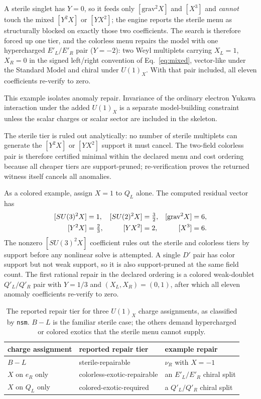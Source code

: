 \documentclass[11pt]{article}
\newcommand{\nsm}{\texttt{nsm}}
\newcommand{\UX}{U(1)_X}
\newcommand{\SUthree}{SU(3)}
\newcommand{\SUtwo}{SU(2)}
\begin{document}
A sterile singlet has $Y=0$, so it feeds only $[\text{grav}^2X]$ and $[X^3]$ and
\emph{cannot} touch the mixed $[Y^2X]$ or $[YX^2]$; the engine reports the
sterile menu as structurally blocked on exactly those two coefficients. The
search is therefore forced up one tier, and the colorless menu repairs the model
with one hypercharged $E'_L/E'_R$ pair ($Y=-2$): two Weyl multiplets carrying
$X_L=1$, $X_R=0$ in the signed left/right convention of Eq.~\eqref{eq:mixed},
vector-like under the Standard Model and chiral under $\UX$. With that pair
included, all eleven coefficients re-verify to zero.

This example isolates anomaly repair. Invariance of the ordinary electron
Yukawa interaction under the added $\UX$ is a separate model-building constraint
unless the scalar charges or scalar sector are included in the skeleton.

The sterile tier is ruled out analytically: no number of sterile multiplets can
generate the $[Y^2X]$ or $[YX^2]$ support it must cancel. The two-field
colorless pair is therefore certified minimal within the declared menu and cost
ordering because all cheaper tiers are support-pruned; re-verification proves
the returned witness itself cancels all anomalies.

As a colored example, assign $X=1$ to $Q_L$ alone. The computed residual vector
has
\[
\begin{aligned}
\relax[\SUthree^2X]&=1, &
[\SUtwo^2X]&=\tfrac32, &
[\text{grav}^2X]&=6,\\
[Y^2X]&=\tfrac23, &
[YX^2]&=2, &
[X^3]&=6 .
\end{aligned}
\]
The nonzero $[\SUthree^2X]$ coefficient rules out the sterile and colorless
tiers by support before any nonlinear solve is attempted. A single $D'$ pair has
color support but not weak support, so it is also support-pruned at the same
field count. The first rational repair in the declared ordering is a colored
weak-doublet $Q'_L/Q'_R$ pair with $Y=1/3$ and $(X_L,X_R)=(0,1)$, after which
all eleven anomaly coefficients re-verify to zero.

\begin{table}[t]
\centering
\small
\begin{tabular}{@{}lll@{}}
\toprule
charge assignment & reported repair tier & example repair\\
\midrule
$B\!-\!L$ & sterile-repairable & $\nu_R$ with $X=-1$\\
$X$ on $e_R$ only & colorless-exotic-repairable & an $E'_L/E'_R$ chiral split\\
$X$ on $Q_L$ only & colored-exotic-required & a $Q'_L/Q'_R$ chiral split\\
\bottomrule
\end{tabular}
\caption{The reported repair tier for three $\UX$ charge assignments, as
classified by \nsm{}. $B\!-\!L$ is the familiar sterile case; the others demand
hypercharged or colored exotics that the sterile menu cannot supply.}
\label{tab:tiers}
\end{table}
\end{document}
